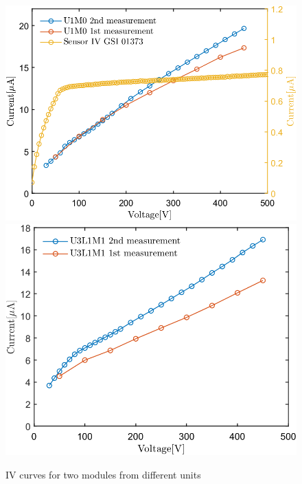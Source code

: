 \begin{figure}[h!]
\centering
\includegraphics[width=0.45\columnwidth]{Chapter3/DCS/images/IV/U1FEB1.png}
\includegraphics[width=0.45\columnwidth]{Chapter3/DCS/images/IV/U3L1FEB3.png}
\caption{IV curves for two modules from different units}
\label{fig_U3L1}
\end{figure}
